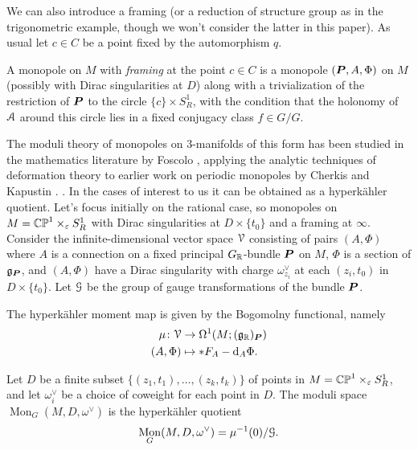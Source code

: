 \documentclass[10pt, oneside]{article}
\DeclareMathOperator{\mon}{Mon}
\renewcommand{\d}{\mathrm{d}}
\begin{document}
We can also introduce a framing (or a reduction of structure group as in the trigonometric example, though we won't consider the latter in this paper).  As usual let $c \in C$ be a point fixed by the automorphism $q$.
\begin{definition}
  A monopole on $M$ with \emph{framing} at the point $c \in C$ is a monopole $(\boldsymbol{P},A,\Phi)$ on $M$ (possibly with Dirac singularities at $D$) along with a trivialization of the restriction of $\boldsymbol{P}$ to the circle $\{c\} \times S^1_R$, with the condition that the holonomy of $\mathcal{A}$ around this circle lies in a fixed conjugacy class $f \in G/G$.
\end{definition}

The moduli theory of monopoles on 3-manifolds of this form has been studied in the mathematics literature by Foscolo \cite{FoscoloDef}, applying the analytic techniques of deformation theory to earlier work on periodic monopoles by Cherkis and Kapustin \cite{CherkisKapustin1, CherkisKapustin2}. .  In the cases of interest to us it can be obtained as a hyperk\"ahler quotient.  Let's focus initially on the rational case, so monopoles on $M = \mathbb{CP}^1 \times_\varepsilon S^1_R$ with Dirac singularities at $D \times \{t_0\}$ and a framing at $\infty$.  Consider the infinite-dimensional vector space $\mathcal{V}$ consisting of pairs $(A,\Phi)$ where $A$ is a connection on a fixed principal $G_{\mathbb{R}}$-bundle $\boldsymbol{P}$ on $M$, $\Phi$ is a section of $\mathfrak{g}_{\boldsymbol{P}}$, and $(A,\Phi)$ have a Dirac singularity with charge $\omega^\vee_{z_i}$ at each $(z_i,t_0)$ in $D \times \{t_0\}$.  Let $\mathcal{G}$ be the group of gauge transformations of the bundle $\boldsymbol{P}$.

The hyperk\"ahler moment map is given by the Bogomolny functional, namely
\begin{align*}
\mu \colon \mc V &\to \Omega^1(M; (\gg_\RR)_{\bo P}) \\
(A,\Phi) &\mapsto \ast F_A - \d_A \Phi.
\end{align*}

\begin{definition}
Let $D$ be a finite subset $\{(z_1,t_1), \ldots, (z_k, t_k)\}$ of points in $M = \mathbb{CP}^1 \times_\varepsilon S^1_R$, and let $\omega^\vee_{i}$ be a choice of coweight for each point in $D$. The moduli space $\mon_G(M, D, \omega^\vee)$ is the hyperk\"ahler quotient
\[\mon_G(M, D, \omega^\vee) = \mu^{-1}(0) / \mc G.\]
\end{definition}
\end{document}

